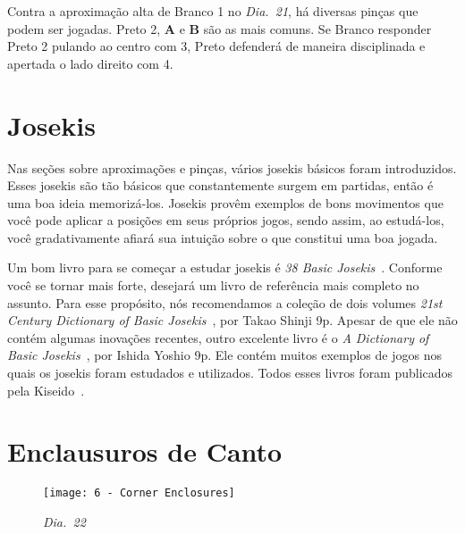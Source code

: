 Contra a aproximação alta de Branco 1 no \emph{Dia.\@~21}, há diversas pinças que podem ser jogadas. Preto 2, \textbf{A} e \textbf{B} são as mais comuns. Se Branco responder Preto 2 pulando ao centro com 3, Preto defenderá de maneira disciplinada e apertada o lado direito com 4.

\pagebreak

\section{Josekis}

Nas seções sobre aproximações e pinças, vários josekis básicos foram introduzidos. Esses josekis são tão básicos que constantemente surgem em partidas, então é uma boa ideia memorizá-los. Josekis provêm exemplos de bons movimentos que você pode aplicar a posições em seus próprios jogos, sendo assim, ao estudá-los, você gradativamente afiará sua intuição sobre o que constitui uma boa jogada.

Um bom livro para se começar a estudar josekis é \emph{38 Basic Josekis}~\cite{kosugi_bozulich_38_basic_joseki}. Conforme você se tornar mais forte, desejará um livro de referência mais completo no assunto. Para esse propósito, nós recomendamos a coleção de dois volumes \emph{21st Century Dictionary of Basic Josekis}~\cite{takao_shinji_21st_century_joseki_dictionary}, por Takao Shinji 9p. Apesar de que ele não contém algumas inovações recentes, outro excelente livro é o \emph{A Dictionary of Basic Josekis}~\cite{ishida_yoshio_basic_joseki_dictionary}, por Ishida Yoshio 9p. Ele contém muitos exemplos de jogos nos quais os josekis foram estudados e utilizados. Todos esses livros foram publicados pela Kiseido~\cite{kiseido}.

\pagebreak

\section{Enclausuros de Canto}

\begin{wrapfigure}{r}{60mm}
    \vspace{-30pt}
    \begin{center}
        \texttt{[image: 6 - Corner Enclosures]}
        \captionsetup{justification=centering}
        \caption*{\emph{Dia.\@~22}}
    \end{center}
    \vspace{-20pt}
\end{wrapfigure}

